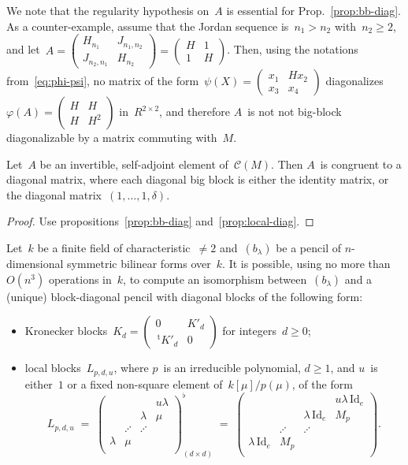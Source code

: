 \documentclass{lms}%
\let\ro\mathscr
\def\transpose{\,{}^{\mathrm{t}\!}}
\def\mat#1{\begin{pmatrix}#1\end{pmatrix}}
\def\Id{\mathrm{Id}}
\begin{document}
We note that the regularity hypothesis on~$A$ is essential for
Prop.~\ref{prop:bb-diag}. As a counter-example, assume that the Jordan
sequence is~$n_1 > n_2$ with~$n_2 ≥ 2$, and let~$A = \mat{H_{n_1} &
J_{n_1,n_2} \\ J_{n_2,n_1} & H_{n_2}} = \mat{H&1\\1&H}$.
Then, using the notations from~\eqref{eq:phi-psi}, no matrix of the
form~$ψ(X) = \mat{x_1&H x_2\\x_3&x_4}$ diagonalizes~$φ(A) =
\mat{H&H\\H&H^2}$ in~$R^{2×2}$, and therefore $A$~is not not big-block
diagonalizable by a matrix commuting with~$M$.
\begin{prop}\label{prop:diag}%
Let~$A$ be an invertible, self-adjoint element of~$\ro C(M)$. Then $A$~is
congruent to a diagonal matrix, where each diagonal big block is either
the identity matrix, or the diagonal matrix~$(1, …, 1, δ)$.
\end{prop}

\begin{proof}
Use propositions~\ref{prop:bb-diag} and~\ref{prop:local-diag}.
\end{proof}%


\begin{thm}\label{thm:IP1S}
Let~$k$ be a finite field of characteristic~$≠2$ and~$(b_{λ})$ be a
pencil of $n$-dimensional symmetric bilinear forms over~$k$.
It is possible, using no more than~$O(n^3)$ operations in~$k$, to compute
an isomorphism between~$(b_{λ})$ and a (unique) block-diagonal pencil
with diagonal blocks of the following form:
\begin{itemize}
\item Kronecker blocks~$K_{d} = \mat{0&K'_{d}\\\transpose{K'_d}&0}$
for integers~$d ≥ 0$;
\item local blocks~$L_{p,d,u}$, where $p$~is an irreducible polynomial,
$d ≥ 1$, and $u$~is either~$1$ or a fixed non-square element
of~$k[μ]/p(μ)$, of the form
\[ L_{p,d,u} \;= \; \mat{ & & &uλ\\ & &λ&μ\\ &⋰&⋰& \\ λ&μ& & \\}_{(d×d)}^{♭}
\;=\;
\mat{ & & &uλ\,\Id_e\\ & &λ\,\Id_e&M_p\\ &⋰&⋰& \\ λ\,\Id_e&M_p& & \\}. \]
\end{itemize}
\end{thm}
\end{document}
